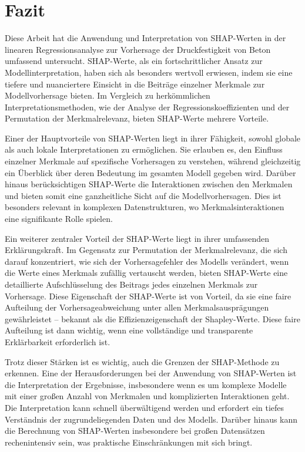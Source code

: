 \chapter{Fazit}

Diese Arbeit hat die Anwendung und Interpretation von SHAP-Werten in der 
linearen Regressionsanalyse zur Vorhersage der Druckfestigkeit von Beton umfassend untersucht. 
SHAP-Werte, als ein fortschrittlicher Ansatz zur Modellinterpretation, haben sich als besonders 
wertvoll erwiesen, indem sie eine tiefere und nuanciertere Einsicht in die Beiträge einzelner 
Merkmale zur Modellvorhersage bieten. Im Vergleich zu herkömmlichen Interpretationsmethoden, 
wie der Analyse der Regressionskoeffizienten und der Permutation der Merkmalrelevanz, 
bieten SHAP-Werte mehrere Vorteile.

Einer der Hauptvorteile von SHAP-Werten liegt in ihrer Fähigkeit, sowohl globale als auch 
lokale Interpretationen zu ermöglichen. Sie erlauben es, den Einfluss einzelner Merkmale auf 
spezifische Vorhersagen zu verstehen, während gleichzeitig ein Überblick über deren Bedeutung 
im gesamten Modell gegeben wird. Darüber hinaus berücksichtigen SHAP-Werte die Interaktionen 
zwischen den Merkmalen und bieten somit eine ganzheitliche Sicht auf die Modellvorhersagen. 
Dies ist besonders relevant in komplexen Datenstrukturen, wo Merkmalsinteraktionen eine signifikante
Rolle spielen.

Ein weiterer zentraler Vorteil der SHAP-Werte liegt in ihrer umfassenden Erklärungskraft.
Im Gegensatz zur Permutation der Merkmalrelevanz, die sich darauf konzentriert, wie sich der 
Vorhersagefehler des Modells verändert, wenn die Werte eines Merkmals zufällig vertauscht werden, 
bieten SHAP-Werte eine detaillierte Aufschlüsselung des Beitrags jedes einzelnen Merkmals zur 
Vorhersage. Diese Eigenschaft der SHAP-Werte ist von Vorteil, da sie eine faire 
Aufteilung der Vorhersageabweichung unter allen Merkmalsausprägungen gewährleistet – bekannt 
als die Effizienzeigenschaft der Shapley-Werte. Diese faire Aufteilung ist dann wichtig, 
wenn eine vollständige und transparente Erklärbarkeit erforderlich ist.

Trotz dieser Stärken ist es wichtig, auch die Grenzen der SHAP-Methode zu erkennen. 
Eine der Herausforderungen bei der Anwendung von SHAP-Werten ist die Interpretation der Ergebnisse, 
insbesondere wenn es um komplexe Modelle mit einer großen Anzahl von Merkmalen und komplizierten 
Interaktionen geht. Die Interpretation kann schnell überwältigend werden und erfordert ein tiefes 
Verständnis der zugrundeliegenden Daten und des Modells. Darüber hinaus kann die Berechnung von 
SHAP-Werten insbesondere bei großen Datensätzen rechenintensiv sein, was praktische Einschränkungen 
mit sich bringt.

